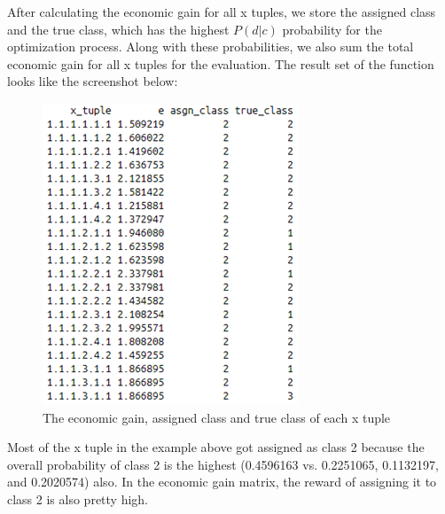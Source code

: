 \documentclass{article}
\begin{document}
\begin{multicols}{2}
        After calculating the economic gain for all x tuples, we store the assigned class and the true class, which has the highest $P(d|c)$ probability for the optimization process. Along with these probabilities, we also sum the total economic gain for all x tuples for the evaluation.
        The result set of the function looks like the screenshot below:
        \begin{figure}[H]
            \centering 
            \includegraphics[width=\linewidth]{fig10.png}
            \caption{The economic gain, assigned class and true class of each x tuple}
        \end{figure}
        Most of the x tuple in the example above got assigned as class 2 because the overall probability of class 2 is the highest (0.4596163 vs. 0.2251065, 0.1132197, and 0.2020574) also. In the economic gain matrix, the reward of assigning it to class 2 is also pretty high.


\end{multicols}
\end{document}
